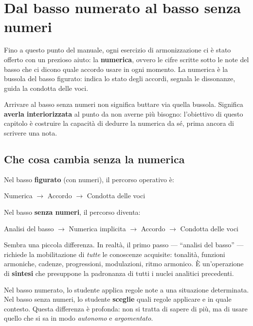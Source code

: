 \chapter{Dal basso numerato al basso senza numeri}
\label{chap:dal_numerato_al_senza_numeri}

Fino a questo punto del manuale, ogni esercizio di armonizzazione ci è stato offerto con un prezioso aiuto: la \textbf{numerica}, ovvero le cifre scritte sotto le note del basso che ci dicono quale accordo usare in ogni momento. La numerica è la bussola del basso figurato: indica lo stato degli accordi, segnala le dissonanze, guida la condotta delle voci.

Arrivare al basso senza numeri non significa buttare via quella bussola. Significa \textbf{averla interiorizzata} al punto da non averne più bisogno: l'obiettivo di questo capitolo è costruire la capacità di dedurre la numerica da sé, prima ancora di scrivere una nota.

\section{Che cosa cambia senza la numerica}
\label{sec:cosa_cambia}

Nel basso \textbf{figurato} (con numeri), il percorso operativo è:
\begin{center}
	Numerica $\rightarrow$ Accordo $\rightarrow$ Condotta delle voci
\end{center}

Nel basso \textbf{senza numeri}, il percorso diventa:
\begin{center}
	Analisi del basso $\rightarrow$ Numerica implicita $\rightarrow$ Accordo $\rightarrow$ Condotta delle voci
\end{center}

Sembra una piccola differenza. In realtà, il primo passo --- ``analisi del basso'' --- richiede la mobilitazione di \textit{tutte} le conoscenze acquisite: tonalità, funzioni armoniche, cadenze, progressioni, modulazioni, ritmo armonico. È un'operazione di \textbf{sintesi} che presuppone la padronanza di tutti i nuclei analitici precedenti.

\begin{osservazione}
	\label{oss:scelta_responsabile}
	Nel basso numerato, lo studente applica regole note a una situazione determinata. Nel basso senza numeri, lo studente \textbf{sceglie} quali regole applicare e in quale contesto. Questa differenza è profonda: non si tratta di sapere di più, ma di usare quello che si sa in modo \textit{autonomo} e \textit{argomentato}.
\end{osservazione}

